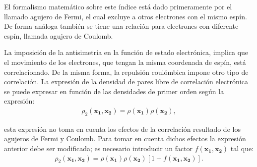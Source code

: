 El formalismo matemático sobre este índice está dado primeramente por el
llamado agujero de Fermi, el cual excluye a otros electrones con el mismo
espín. De forma análoga también se tiene una relación para electrones con
diferente espín, llamada agujero de Coulomb.

La imposición de la antisimetría en la función de estado electrónica, implica
que el movimiento de los electrones, que tengan la misma coordenada de espín,
está correlacionado. De la misma forma, la repulsión coulómbica impone otro
tipo de correlación. La expresión de la densidad de pares libre de correlación
electrónica se puede expresar en función de las densidades de primer orden
según la expresión: 
%
%
\begin{align}
  \rho_2 (\mathbf{x_1 , x_2}) = \rho(\mathbf{x_1})\rho(\mathbf{x_2}),
\end{align}

\noindent esta expresión no toma en cuenta los efectos de la correlación
resultado de los agujeros de Fermi y Coulomb. Para tomar en cuenta dichos
efectos la expresión anterior debe ser modificada; es necesario introducir un
factor $f(\mathbf{x_1 , x_2})$ tal que:
%
%
\begin{align}
  \rho_2 (\mathbf{x_1 , x_2}) = \rho(\mathbf{x_1}) \rho(\mathbf{x_2})[1+ f(\mathbf{x_1 , x_2})] .
\end{align}

